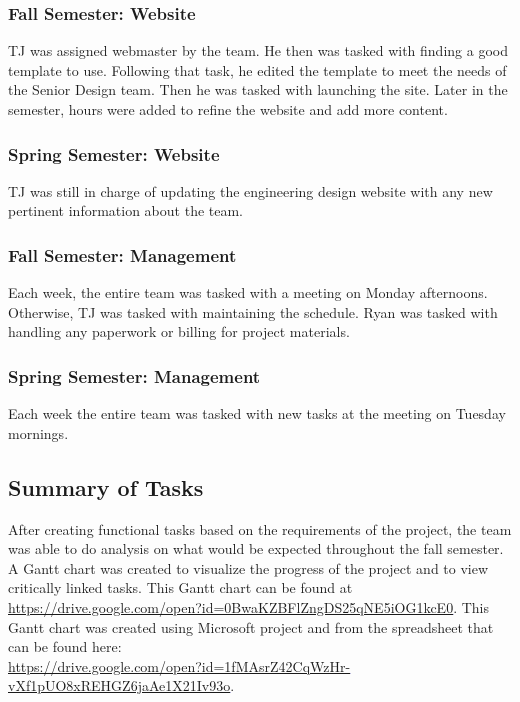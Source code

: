 \documentclass[PPFS.tex]{template/subfiles}
\begin{document}
\subsubsection{Fall Semester: Website}
TJ was assigned webmaster by the team. He then was tasked with finding a good template to use. Following that task, he edited the template to meet the needs of the Senior Design team. Then he was tasked with launching the site. Later in the semester, hours were added to refine the website and add more content.

\subsubsection{Spring Semester: Website}
TJ was still in charge of updating the engineering design website with any new pertinent information about the team.

\subsubsection{Fall Semester: Management}
Each week, the entire team was tasked with a meeting on Monday afternoons. Otherwise, TJ was tasked with maintaining the schedule. Ryan was tasked with handling any paperwork or billing for project materials.

\subsubsection{Spring Semester: Management}
Each week the entire team was tasked with new tasks at the meeting on Tuesday mornings.


\subsection{Summary of Tasks}

After creating functional tasks based on the requirements of the project, the team was able to do analysis on what would be expected throughout the fall semester. A Gantt chart was created to visualize the progress of the project and to view critically linked tasks.
This Gantt chart can be found at \textcolor{blue}{\underline{\url{https://drive.google.com/open?id=0BwaKZBFlZngDS25qNE5iOG1kcE0}}}. This Gantt chart was created using Microsoft project and from the spreadsheet that can be found here:\\ \textcolor{blue}{\underline{\url{https://drive.google.com/open?id=1fMAsrZ42CqWzHr-vXf1pUO8xREHGZ6jaAe1X21Iv93o}}}.
\end{document}
